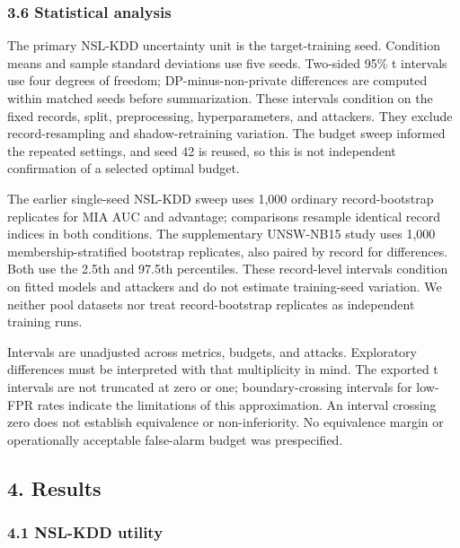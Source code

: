\documentclass[11pt,a4paper]{article}
\begin{document}
\hypertarget{statistical-analysis}{%
\subsubsection{3.6 Statistical analysis}\label{statistical-analysis}}

The primary NSL-KDD uncertainty unit is the target-training seed.
Condition means and sample standard deviations use five seeds. Two-sided
95\% t intervals use four degrees of freedom; DP-minus-non-private
differences are computed within matched seeds before summarization.
These intervals condition on the fixed records, split, preprocessing,
hyperparameters, and attackers. They exclude record-resampling and
shadow-retraining variation. The budget sweep informed the repeated
settings, and seed 42 is reused, so this is not independent confirmation
of a selected optimal budget.

The earlier single-seed NSL-KDD sweep uses 1,000 ordinary
record-bootstrap replicates for MIA AUC and advantage; comparisons
resample identical record indices in both conditions. The supplementary
UNSW-NB15 study uses 1,000 membership-stratified bootstrap replicates,
also paired by record for differences. Both use the 2.5th and 97.5th
percentiles. These record-level intervals condition on fitted models and
attackers and do not estimate training-seed variation. We neither pool
datasets nor treat record-bootstrap replicates as independent training
runs.

Intervals are unadjusted across metrics, budgets, and attacks.
Exploratory differences must be interpreted with that multiplicity in
mind. The exported t intervals are not truncated at zero or one;
boundary-crossing intervals for low-FPR rates indicate the limitations
of this approximation. An interval crossing zero does not establish
equivalence or non-inferiority. No equivalence margin or operationally
acceptable false-alarm budget was prespecified.

\hypertarget{results}{%
\subsection{4. Results}\label{results}}

\hypertarget{nsl-kdd-utility}{%
\subsubsection{4.1 NSL-KDD utility}\label{nsl-kdd-utility}}
\end{document}

